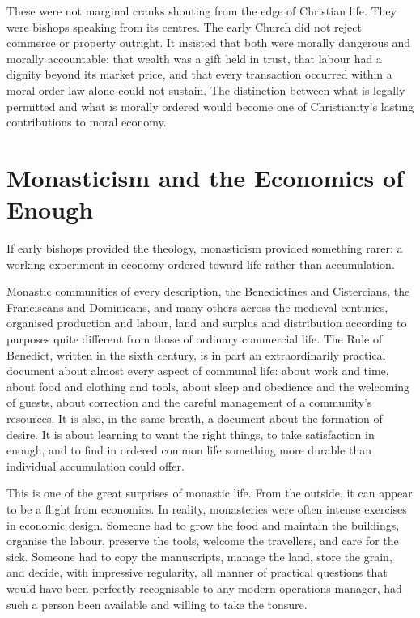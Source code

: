 \documentclass[11pt,a4paper,oneside]{book}
\begin{document}
These were not marginal cranks shouting from the edge of Christian life. They were bishops speaking from its centres. The early Church did not reject commerce or property outright. It insisted that both were morally dangerous and morally accountable: that wealth was a gift held in trust, that labour had a dignity beyond its market price, and that every transaction occurred within a moral order law alone could not sustain. The distinction between what is legally permitted and what is morally ordered would become one of Christianity's lasting contributions to moral economy.

\section*{Monasticism and the Economics of Enough}

If early bishops provided the theology, monasticism provided something rarer: a working experiment in economy ordered toward life rather than accumulation.

Monastic communities of every description, the Benedictines and Cistercians, the Franciscans and Dominicans, and many others across the medieval centuries, organised production and labour, land and surplus and distribution according to purposes quite different from those of ordinary commercial life. The Rule of Benedict, written in the sixth century, is in part an extraordinarily practical document about almost every aspect of communal life: about work and time, about food and clothing and tools, about sleep and obedience and the welcoming of guests, about correction and the careful management of a community's resources. It is also, in the same breath, a document about the formation of desire. It is about learning to want the right things, to take satisfaction in enough, and to find in ordered common life something more durable than individual accumulation could offer.

This is one of the great surprises of monastic life. From the outside, it can appear to be a flight from economics. In reality, monasteries were often intense exercises in economic design. Someone had to grow the food and maintain the buildings, organise the labour, preserve the tools, welcome the travellers, and care for the sick. Someone had to copy the manuscripts, manage the land, store the grain, and decide, with impressive regularity, all manner of practical questions that would have been perfectly recognisable to any modern operations manager, had such a person been available and willing to take the tonsure.
\end{document}
